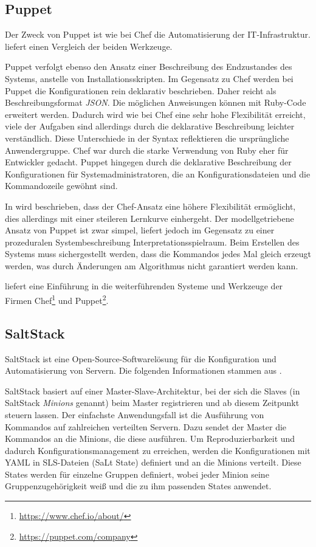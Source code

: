 \subsection{Puppet}
\label{sub:puppet}
Der Zweck von Puppet ist wie bei Chef die Automatisierung der IT-Infrastruktur. \autocite{Wolff201604} liefert einen Vergleich der beiden Werkzeuge.

Puppet verfolgt ebenso den Ansatz einer Beschreibung des Endzustandes des Systems, anstelle von Installationsskripten.
Im Gegensatz zu Chef werden bei Puppet die Konfigurationen rein deklarativ beschrieben.
Daher reicht als Beschreibungsformat \emph{JSON}.
Die möglichen Anweisungen können mit Ruby-Code erweitert werden.
Dadurch wird wie bei Chef eine sehr hohe Flexibilität erreicht, viele der Aufgaben sind allerdings durch die deklarative Beschreibung leichter verständlich.
Diese Unterschiede in der Syntax reflektieren die ursprüngliche Anwendergruppe.
Chef war durch die starke Verwendung von Ruby eher für Entwickler gedacht.
Puppet hingegen durch die deklarative Beschreibung der Konfigurationen für Systemadministratoren, die an Konfigurationsdateien und die Kommandozeile gewöhnt sind.

In \autocite{chef-vs-puppet:online} wird beschrieben, dass der Chef-Ansatz eine höhere Flexibilität ermöglicht, dies allerdings mit einer steileren Lernkurve einhergeht.
Der modellgetriebene Ansatz von Puppet ist zwar simpel, liefert jedoch im Gegensatz zu einer prozeduralen Systembeschreibung Interpretationsspielraum.
Beim Erstellen des Systems muss sichergestellt werden, dass die Kommandos jedes Mal gleich erzeugt werden, was durch Änderungen am Algorithmus nicht garantiert werden kann.

\autocite{chef-vs-puppet-revisited:online} liefert eine Einführung in die weiterführenden Systeme und Werkzeuge der Firmen Chef\footnote{\url{https://www.chef.io/about/}} und Puppet\footnote{\url{https://puppet.com/company}}.

\subsection{SaltStack}
\label{sub:saltstack}
SaltStack ist eine Open-Source-Softwarelösung für die Konfiguration und Automatisierung von Servern.
Die folgenden Informationen stammen aus \autocite{SaltStack:online}.

SaltStack basiert auf einer Master-Slave-Architektur, bei der sich die Slaves (in SaltStack \emph{Minions} genannt) beim Master registrieren und ab diesem Zeitpunkt steuern lassen.
Der einfachste Anwendungsfall ist die Ausführung von Kommandos auf zahlreichen verteilten Servern.
Dazu sendet der Master die Kommandos an die Minions, die diese ausführen.
Um Reproduzierbarkeit und dadurch Konfigurationsmanagement zu erreichen, werden die Konfigurationen mit YAML in SLS-Dateien (SaLt State) definiert und an die Minions verteilt.
Diese States werden für einzelne Gruppen definiert, wobei jeder Minion seine Gruppenzugehörigkeit weiß und die zu ihm passenden States anwendet.

